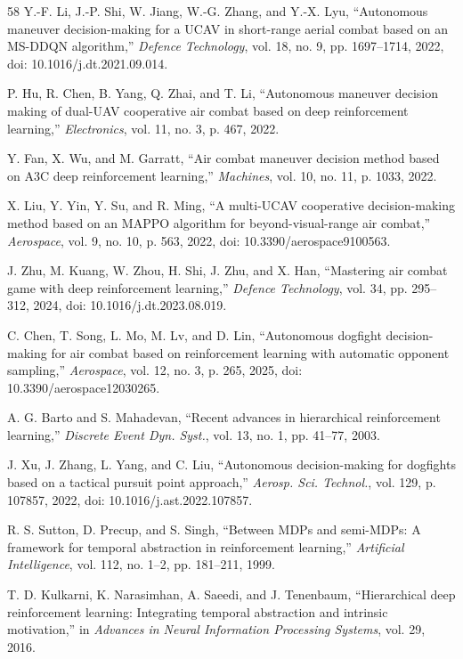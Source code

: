 \documentclass[conference]{IEEEtran}
\begin{document}
\begin{thebibliography}{58}
Y.-F. Li, J.-P. Shi, W. Jiang, W.-G. Zhang, and Y.-X. Lyu,
``Autonomous maneuver decision-making for a UCAV in short-range aerial combat based on an MS-DDQN algorithm,''
\emph{Defence Technology}, vol. 18, no. 9, pp. 1697--1714, 2022,
doi: 10.1016/j.dt.2021.09.014.

P. Hu, R. Chen, B. Yang, Q. Zhai, and T. Li,
``Autonomous maneuver decision making of dual-UAV cooperative air combat based on deep reinforcement learning,''
\emph{Electronics}, vol. 11, no. 3, p. 467, 2022.

Y. Fan, X. Wu, and M. Garratt,
``Air combat maneuver decision method based on A3C deep reinforcement learning,''
\emph{Machines}, vol. 10, no. 11, p. 1033, 2022.

X. Liu, Y. Yin, Y. Su, and R. Ming,
``A multi-UCAV cooperative decision-making method based on an MAPPO algorithm for beyond-visual-range air combat,''
\emph{Aerospace}, vol. 9, no. 10, p. 563, 2022,
doi: 10.3390/aerospace9100563.

J. Zhu, M. Kuang, W. Zhou, H. Shi, J. Zhu, and X. Han,
``Mastering air combat game with deep reinforcement learning,''
\emph{Defence Technology}, vol. 34, pp. 295--312, 2024,
doi: 10.1016/j.dt.2023.08.019.

C. Chen, T. Song, L. Mo, M. Lv, and D. Lin,
``Autonomous dogfight decision-making for air combat based on reinforcement learning with automatic opponent sampling,''
\emph{Aerospace}, vol. 12, no. 3, p. 265, 2025,
doi: 10.3390/aerospace12030265.

A. G. Barto and S. Mahadevan,
``Recent advances in hierarchical reinforcement learning,''
\emph{Discrete Event Dyn. Syst.}, vol. 13, no. 1, pp. 41--77, 2003.

J. Xu, J. Zhang, L. Yang, and C. Liu,
``Autonomous decision-making for dogfights based on a tactical pursuit point approach,''
\emph{Aerosp. Sci. Technol.}, vol. 129, p. 107857, 2022,
doi: 10.1016/j.ast.2022.107857.

R. S. Sutton, D. Precup, and S. Singh,
``Between MDPs and semi-MDPs: A framework for temporal abstraction in reinforcement learning,''
\emph{Artificial Intelligence}, vol. 112, no. 1--2, pp. 181--211, 1999.

T. D. Kulkarni, K. Narasimhan, A. Saeedi, and J. Tenenbaum,
``Hierarchical deep reinforcement learning: Integrating temporal abstraction and intrinsic motivation,''
in \emph{Advances in Neural Information Processing Systems}, vol. 29, 2016.


\end{thebibliography}
\end{document}
